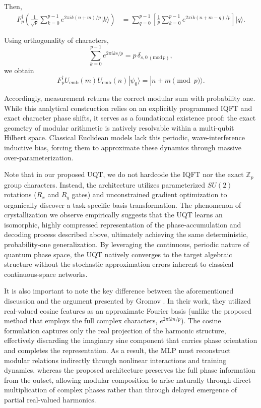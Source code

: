 \documentclass[11pt, a4paper]{article}
\begin{document}
\noindent Then,
\begin{align}
F_p^\dagger
\left(
\frac{1}{\sqrt p}\sum_{k=0}^{p-1}e^{2\pi i k(n+m)/p}|k\rangle
\right)
&=
\sum_{q=0}^{p-1}
\left[
\frac{1}{p}\sum_{k=0}^{p-1}e^{2\pi i k(n+m-q)/p}
\right]|q\rangle.
\end{align}

\noindent Using orthogonality of characters,
\begin{equation}
\sum_{k=0}^{p-1}e^{2\pi i ks/p}=p\,\delta_{s,0 \, (\mathrm{mod}\, p)},
\end{equation}
we obtain
\begin{equation}
F_p^\dagger U_{\mathrm{emb}}(m)U_{\mathrm{emb}}(n)|\psi_0\rangle
=
|n+m \pmod p\rangle.
\end{equation}

Accordingly, measurement returns the correct modular sum with probability one. While this analytical construction relies on an explicitly programmed IQFT and exact character phase shifts, it serves as a foundational existence proof: the exact geometry of modular arithmetic is natively resolvable within a multi-qubit Hilbert space. Classical Euclidean models lack this periodic, wave-interference inductive bias, forcing them to approximate these dynamics through massive over-parameterization.

Note that in our proposed UQT, we do not hardcode the IQFT nor the exact $\mathbb{Z}_p$ group characters. Instead, the architecture utilizes parameterized $SU(2)$ rotations ($R_x$ and $R_y$ gates) and unconstrained gradient optimization to organically discover a task-specific basis transformation. The phenomenon of crystallization we observe empirically suggests that the UQT learns an isomorphic, highly compressed representation of the phase-accumulation and decoding process described above, ultimately achieving the same deterministic, probability-one generalization. By leveraging the continuous, periodic nature of quantum phase space, the UQT natively converges to the target algebraic structure without the stochastic approximation errors inherent to classical continuous-space networks.

It is also important to note the key difference between the aforementioned discussion and the argument presented by Gromov \cite{gromov2023grokking}. In their work, they utilized real-valued cosine features as an approximate Fourier basis (unlike the proposed method that employs the full complex characters, $e^{2\pi i kn/p}$). The cosine formulation captures only the real projection of the harmonic structure, effectively discarding the imaginary sine component that carries phase orientation and completes the representation. As a result, the MLP must reconstruct modular relations indirectly through nonlinear interactions and training dynamics, whereas the proposed architecture preserves the full phase information from the outset, allowing modular composition to arise naturally through direct multiplication of complex phases rather than through delayed emergence of partial real-valued harmonics.
\end{document}
